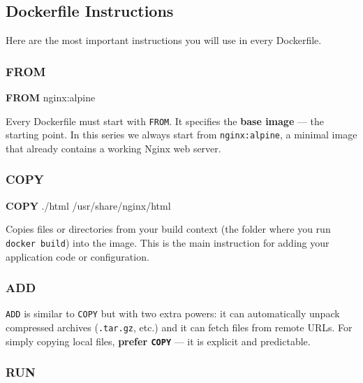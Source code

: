 \documentclass[11pt,american,a4paper,openany]{book}
\newenvironment{Shaded}{}{}
\newcommand{\KeywordTok}[1]{\textcolor[rgb]{0.00,0.44,0.13}{\textbf{#1}}}
\newcommand{\NormalTok}[1]{#1}
\begin{document}
\subsection{Dockerfile Instructions}\label{dockerfile-instructions}

Here are the most important instructions you will use in every
Dockerfile.

\subsubsection{FROM}\label{from}

\begin{Shaded}
\begin{Highlighting}[]
\KeywordTok{FROM}\NormalTok{ nginx:alpine}
\end{Highlighting}
\end{Shaded}

Every Dockerfile must start with \texttt{FROM}. It specifies the
\textbf{base image} --- the starting point. In this series we always
start from \texttt{nginx:alpine}, a minimal image that already contains
a working Nginx web server.

\subsubsection{COPY}\label{copy}

\begin{Shaded}
\begin{Highlighting}[]
\KeywordTok{COPY}\NormalTok{ ./html /usr/share/nginx/html}
\end{Highlighting}
\end{Shaded}

Copies files or directories from your build context (the folder where
you run \texttt{docker\ build}) into the image. This is the main
instruction for adding your application code or configuration.

\subsubsection{ADD}\label{add}

\texttt{ADD} is similar to \texttt{COPY} but with two extra powers: it
can automatically unpack compressed archives (\texttt{.tar.gz}, etc.)
and it can fetch files from remote URLs. For simply copying local files,
\textbf{prefer \texttt{COPY}} --- it is explicit and predictable.

\subsubsection{RUN}\label{run}
\end{document}
